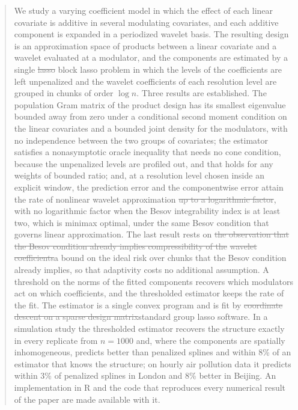\documentclass[12pt]{article} %
\theoremstyle{definition}
\theoremstyle{plain}
\begin{document}
\begin{quotation}
We study a varying coefficient model in which the effect of each linear
covariate is additive in several modulating covariates, and each additive
component is expanded in a periodized wavelet basis. The resulting design is
\textcolor{colR1}{an approximation space} of products between a linear covariate and a wavelet evaluated at a
modulator, and the components are estimated by a single \textcolor{gray}{\sout{lasso}}
\textcolor{colR1}{block lasso} problem in
which the levels of the coefficients are left unpenalized \textcolor{colR1}{and the
wavelet coefficients of each resolution level are grouped in chunks of order
$\log n$}. Three results are
established. The population Gram matrix of the product design has its
smallest eigenvalue bounded away from zero under a conditional second moment
condition on the linear covariates and a bounded joint density for the
modulators, with no independence between the two groups of covariates; the
estimator satisfies a nonasymptotic oracle inequality that needs no cone
condition, because the unpenalized levels are profiled out\textcolor{colR1}{, and
that holds for any weights of bounded ratio}; and, at a
resolution level chosen inside an explicit window, the prediction error and
the componentwise error attain the rate of nonlinear wavelet approximation\textcolor{gray}{\sout{ up
to a logarithmic factor}}\textcolor{colR1}{, with no logarithmic factor when the Besov
integrability index is at least two}\textcolor{colR1}{, which is minimax optimal}, under the same Besov condition that governs
\textcolor{colR1}{linear approximation}. The last result rests on \textcolor{gray}{\sout{the observation that the Besov
condition already implies compressibility of the}} \textcolor{gray}{\sout{wavelet}} \textcolor{gray}{\sout{coefficients}}\textcolor{colR1}{a
bound on the ideal risk over chunks that the Besov condition already implies},
so that adaptivity costs no additional assumption. \textcolor{colR1}{A threshold on the
norms of the fitted components recovers which modulators act on which
coefficients, and the thresholded estimator keeps the rate of the fit.} The
estimator is a single convex
program and is fit by \textcolor{gray}{\sout{coordinate descent on a sparse design matrix}}\textcolor{colR1}{standard
group lasso software}.
\textcolor{colR1}{In a simulation study the thresholded estimator recovers
the structure exactly in every replicate from $n = 1000$ and, where the
components are spatially inhomogeneous, predicts better than penalized
splines and within 8\% of an estimator that knows the structure; on hourly
air pollution data it predicts within 3\% of penalized splines in London and
8\% better in Beijing.}
\textcolor{colR1}{An implementation in R and the code that reproduces every
numerical result of the paper are made available with it.}


\end{quotation}
\end{document}
